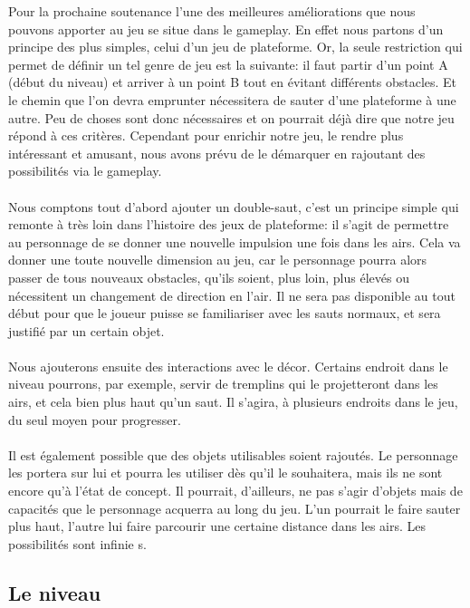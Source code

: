 \documentclass[a4paper]{article}
\begin{document}
Pour la prochaine soutenance l'une des meilleures améliorations que nous pouvons apporter au jeu se situe dans le gameplay. En effet nous partons d'un principe des plus simples, celui d'un jeu de plateforme. Or, la seule restriction qui permet de définir un tel genre de jeu est la suivante: il faut partir d'un point A (début du niveau) et arriver à un point B tout en évitant différents obstacles. Et le chemin que l'on devra emprunter nécessitera de sauter d'une plateforme à une autre. 
Peu de choses sont donc nécessaires et on pourrait déjà dire que notre jeu répond à ces critères. Cependant pour enrichir notre jeu, le rendre plus intéressant et amusant, nous avons prévu de le démarquer en rajoutant des possibilités via le gameplay. \\
\\
Nous comptons tout d'abord ajouter un double-saut, c'est un principe simple qui remonte à très loin dans l'histoire des jeux de plateforme: il s'agit de permettre au personnage de se donner une nouvelle impulsion une fois dans les airs. Cela va donner une toute nouvelle dimension au jeu, car le personnage pourra alors passer de tous nouveaux obstacles, qu'ils soient, plus loin, plus élevés ou nécessitent un changement de direction en l'air. Il ne sera pas disponible au tout début pour que le joueur puisse se familiariser avec les sauts normaux, et sera justifié par un certain objet.\\
\\
Nous ajouterons ensuite des interactions avec le décor. Certains endroit dans le niveau pourrons, par exemple, servir de tremplins qui le projetteront dans les airs, et cela bien plus haut qu'un saut. Il s'agira, à plusieurs endroits dans le jeu, du seul moyen pour progresser.\\
\\
Il est également possible que des objets utilisables soient rajoutés. Le personnage les portera sur lui et pourra les utiliser dès qu'il le souhaitera, mais ils ne sont encore qu'à l'état de concept. Il pourrait, d’ailleurs, ne pas s'agir d'objets mais de capacités que le personnage acquerra au long du jeu.
L'un pourrait le faire sauter plus haut, l'autre lui faire parcourir une certaine distance dans les airs. Les possibilités sont infinie s.

\pagebreak

\subsection{Le niveau}
\vspace{0.5 cm}
\end{document}
